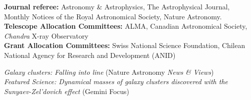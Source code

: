 \documentclass[11pt]{article}
\begin{document}

\noindent 
\textbf{Journal referee:} Astronomy \& Astrophysics, The Astrophysical Journal, Monthly Notices of the Royal Astronomical Society, Nature Astronomy.\\
\noindent
\textbf{Telescope Allocation Committees:}
ALMA, Canadian Astronomical Society, \textit{Chandra} X-ray Observatory\\
\noindent
\textbf{Grant Allocation Committees:} Swiss National Science Foundation, Chilean National Agency for Research and Development (ANID)




\noindent
 \emph{Galaxy clusters: Falling into line} (Nature Astronomy \emph{News \& Views})\\
 \emph{Featured Science: Dynamical masses of galaxy clusters discovered with the Sunyaev-Zel'dovich effect} (Gemini Focus)

\end{document}
